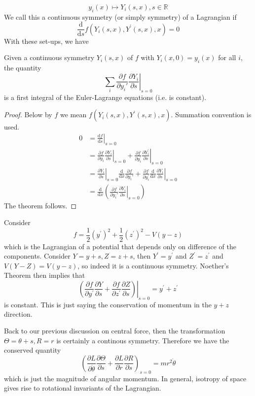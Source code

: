 \documentclass[a4paper]{article}
\begin{document}
$$y_i(x)\mapsto Y_i(s,x),s\in\mathbb R$$
We call this a continuous symmetry (or simply symmetry) of a Lagrangian if
$$\frac{\mathrm d}{\mathrm ds}f(Y_i(s,x),Y^\prime(s,x),x)=0$$
With these set-ups, we have
\begin{theorem}
    Given a continuous symmetry $Y_i(s,x)$ of $f$ with $Y_i(x,0)=y_i(x)$ for all $i$, the quantity
    $$\sum_i\frac{\partial f}{\partial y_i'}\left.\frac{\partial Y_i}{\partial s}\right|_{s=0}$$
    is a first integral of the Euler-Lagrange equations (i.e. is constant).
\end{theorem}
\begin{proof}
    Below by $f$ we mean $f(Y_i(s,x),Y^\prime(s,x),x)$.
    Summation convention is used.
    \begin{align*}
        0&=\left.\frac{\mathrm df}{\mathrm ds}\right|_{s=0}\\
        &=\frac{\partial f}{\partial y_i}\left.\frac{\partial Y_i}{\partial s}\right|_{s=0}+\frac{\partial f}{\partial y_i^\prime}\left.\frac{\partial Y_i^\prime}{\partial s}\right|_{s=0}\\
        &=\left.\frac{\partial Y_i}{\partial s}\right|_{s=0}\frac{\mathrm d}{\mathrm dx}\frac{\partial f}{\partial y_i'}+\frac{\partial f}{\partial y_i^\prime}\left.\frac{\mathrm d}{\mathrm dx}\frac{\partial Y_i}{\partial s}\right|_{s=0}\\
        &=\frac{\mathrm d}{\mathrm dx}\left( \frac{\partial f}{\partial y_i'}\left.\frac{\partial Y_i}{\partial s}\right|_{s=0} \right)
    \end{align*}
    The theorem follows.
\end{proof}
\begin{example}
    Consider
    $$f=\frac{1}{2}(y^\prime)^2+\frac{1}{2}(z^\prime)^2-V(y-z)$$
    which is the Lagrangian of a potential that depends only on difference of the components.
    Consider $Y=y+s, Z=z+s$, then $Y^\prime=y^\prime$ and $Z^\prime=z^\prime$ and $V(Y-Z)=V(y-z)$, so indeed it is a continuous symmetry.
    Noether's Theorem then implies that
    $$\left.\left( \frac{\partial f}{\partial y^\prime}\frac{\partial Y}{\partial s}+\frac{\partial f}{\partial z^\prime}\frac{\partial Z}{\partial s} \right)\right|_{s=0}=y^\prime+z^\prime$$
    is constant.
    This is just saying the conservation of momentum in the $y+z$ direction.
\end{example}
\begin{example}
    Back to our previous discussion on central force, then the transformation $\Theta=\theta+s,R=r$ is certainly a continous symmetry.
    Therefore we have the conserved quantity
    $$\left( \frac{\partial L}{\partial\dot{\theta}}\frac{\partial\Theta}{\partial s}+\frac{\partial L}{\partial\dot{r}}\frac{\partial R}{\partial s} \right)_{s=0}=mr^2\dot{\theta}$$
    which is just the magnitude of angular momentum.
    In general, isotropy of space gives rise to rotational invariants of the Lagrangian.
\end{example}
\end{document}
